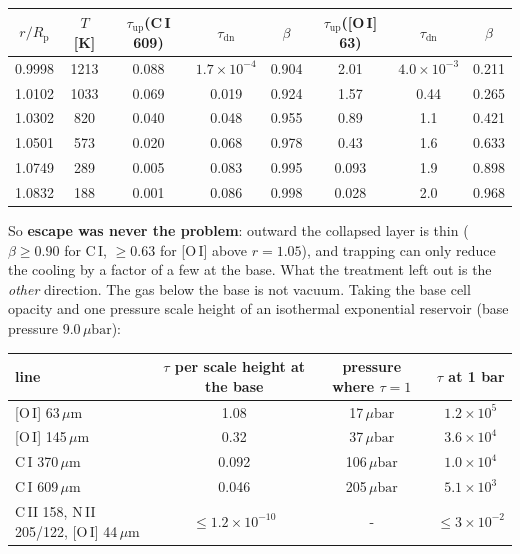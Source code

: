 \documentclass[english,a4paper]{my_memo}
\newcommand{\Rp}{R_{\mathrm{p}}}
\newcommand{\ubar}{\mu\mathrm{bar}}
\begin{document}
\begin{center}\small
\begin{tabular}{@{}cccccccc@{}}
\toprule
$r/\Rp$ & $T$ [K] & $\tau_\mathrm{up}$(C\,I 609) & $\tau_\mathrm{dn}$ & $\beta$
 & $\tau_\mathrm{up}$([O\,I] 63) & $\tau_\mathrm{dn}$ & $\beta$ \\
\midrule
0.9998 & 1213 & 0.088 & $1.7\times10^{-4}$ & 0.904 & 2.01  & $4.0\times10^{-3}$ & 0.211 \\
1.0102 & 1033 & 0.069 & 0.019 & 0.924 & 1.57  & 0.44 & 0.265 \\
1.0302 &  820 & 0.040 & 0.048 & 0.955 & 0.89  & 1.1  & 0.421 \\
1.0501 &  573 & 0.020 & 0.068 & 0.978 & 0.43  & 1.6  & 0.633 \\
1.0749 &  289 & 0.005 & 0.083 & 0.995 & 0.093 & 1.9  & 0.898 \\
1.0832 &  188 & 0.001 & 0.086 & 0.998 & 0.028 & 2.0  & 0.968 \\
\bottomrule
\end{tabular}
\end{center}

\noindent So \textbf{escape was never the problem}: outward the collapsed layer is
thin ($\beta\ge0.90$ for C\,I, $\ge0.63$ for [O\,I] above $r=1.05$), and trapping
can only reduce the cooling by a factor of a few at the base. What the treatment
left out is the \emph{other} direction. The gas below the base is not vacuum.
Taking the base cell opacity and one pressure scale height of an isothermal
exponential reservoir (base pressure 9.0\,$\ubar$):

\begin{center}\small
\begin{tabular}{@{}lccc@{}}
\toprule
line & $\tau$ per scale height at the base & pressure where $\tau=1$ & $\tau$ at 1 bar \\
\midrule
{}[O\,I] 63\,$\mu$m  & 1.08  & 17\,$\ubar$  & $1.2\times10^{5}$ \\
{}[O\,I] 145\,$\mu$m & 0.32  & 37\,$\ubar$  & $3.6\times10^{4}$ \\
C\,I 370\,$\mu$m     & 0.092 & 106\,$\ubar$ & $1.0\times10^{4}$ \\
C\,I 609\,$\mu$m     & 0.046 & 205\,$\ubar$ & $5.1\times10^{3}$ \\
C\,II 158, N\,II 205/122, [O\,I] 44\,$\mu$m & $\le1.2\times10^{-10}$ & - & $\le3\times10^{-2}$ \\
\bottomrule
\end{tabular}
\end{center}
\end{document}
